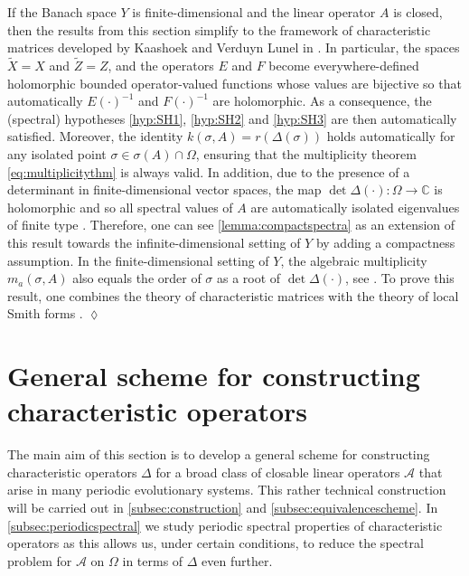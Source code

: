\documentclass[english]{myarticle}
\begin{document}
\begin{sloppypar}
\begin{remark} \label{remark:Yfinitedim}
If the Banach space $Y$ is finite-dimensional and the linear operator $A$ is closed, then the results from this section simplify to the framework of characteristic matrices developed by Kaashoek and Verduyn Lunel in \cite{Kaashoek1992,Kaashoek2022}. In particular, the spaces $\tilde{X} = X$ and $\tilde{Z} = Z$, and the operators $E$ and $F$ become everywhere-defined holomorphic bounded operator-valued functions whose values are bijective so that automatically $E(\cdot)^{-1}$ and $F(\cdot)^{-1}$ are holomorphic. As a consequence, the (spectral) hypotheses \ref{hyp:SH1}, \ref{hyp:SH2} and \ref{hyp:SH3} are then automatically satisfied. Moreover, the identity $k(\sigma,A) = r(\Delta(\sigma))$ holds automatically for any isolated point $\sigma \in \sigma(A) \cap \Omega$, ensuring that the multiplicity theorem \eqref{eq:multiplicitythm} is always valid. In addition, due to the presence of a determinant in finite-dimensional vector spaces, the map $\det \Delta(\cdot) : \Omega \to \mathbb{C}$ is holomorphic and so all spectral values of $A$ are automatically isolated eigenvalues of finite type \cite[Theorem I.2.1]{Kaashoek1992}. Therefore, one can see \cref{lemma:compactspectra} as an extension of this result towards the infinite-dimensional setting of $Y$ by adding a compactness assumption. In the finite-dimensional setting of $Y$, the algebraic multiplicity $m_a(\sigma,A)$ also equals the order of $\sigma$ as a root of $\det \Delta(\cdot)$, see \cite[Theorem I.2.1]{Kaashoek1992}. To prove this result, one combines the theory of characteristic matrices with the theory of local Smith forms \cite{Kaashoek1992,Kaashoek2022,Diekmann1995}. \hfill $\lozenge$
\end{remark}

\section{General scheme for constructing characteristic operators} \label{sec:construction}
The main aim of this section is to develop a general scheme for constructing  characteristic operators $\Delta$ for a broad class of closable linear operators $\mathcal{A}$ that arise in many periodic evolutionary systems. This rather technical construction will be carried out in \cref{subsec:construction} and \cref{subsec:equivalencescheme}. In \cref{subsec:periodicspectral} we study periodic spectral properties of characteristic operators as this allows us, under certain conditions, to reduce the spectral problem for $\mathcal{A}$ on $\Omega$ in terms of $\Delta$ even further.


\end{sloppypar}
\end{document}
